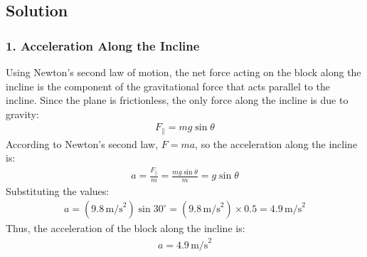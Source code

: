\documentclass[letterpaper,10pt,english]{jupyterBook}
\begin{document}
\subsection{Solution}
\label{\detokenize{prerequisites:id16}}

\subsubsection{1. Acceleration Along the Incline}
\label{\detokenize{prerequisites:acceleration-along-the-incline}}
\sphinxAtStartPar
Using Newton’s second law of motion, the net force acting on the block along the incline is the component of the gravitational force that acts parallel to the incline. Since the plane is frictionless, the only force along the incline is due to gravity:
\begin{equation*}
\begin{split}
F_{\parallel} = mg \sin \theta
\end{split}
\end{equation*}
\sphinxAtStartPar
According to Newton’s second law, \( F = ma \), so the acceleration along the incline is:
\begin{equation*}
\begin{split}
a = \frac{F_{\parallel}}{m} = \frac{mg \sin \theta}{m} = g \sin \theta
\end{split}
\end{equation*}
\sphinxAtStartPar
Substituting the values:
\begin{equation*}
\begin{split}
a = (9.8 \, \text{m/s}^2) \sin 30^\circ = (9.8 \, \text{m/s}^2) \times 0.5 = 4.9 \, \text{m/s}^2
\end{split}
\end{equation*}
\sphinxAtStartPar
Thus, the acceleration of the block along the incline is:
\begin{equation*}
\begin{split}
a = 4.9 \, \text{m/s}^2
\end{split}
\end{equation*}
\end{document}
